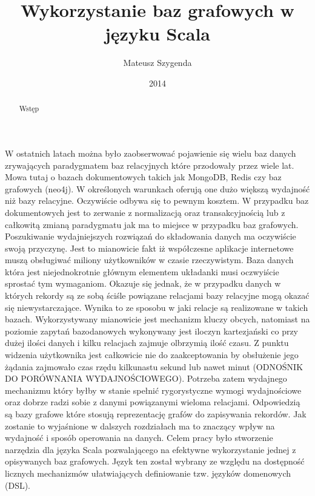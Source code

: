 \documentclass[brudnopis]{xmgr}
\author   {Mateusz Szygenda}
\title    {Wykorzystanie baz grafowych w języku Scala}
\date     {2014}
\begin{document}
\begin{abstract}
Wstęp
\end{abstract}

\maketitle

%
\introduction

W ostatnich latach można było zaobserwować pojawienie się wielu baz danych zrywających paradygmatem baz relacyjnych które przodowały przez wiele lat. Mowa tutaj o bazach dokumentowych takich jak MongoDB, Redis czy baz grafowych (neo4j). W określonych warunkach oferują one dużo większą wydajność niż bazy relacyjne. Oczywiście odbywa się to pewnym kosztem. W przypadku baz dokumentowych jest to zerwanie z normalizacją oraz transakcyjnością lub z całkowitą zmianą paradygmatu jak ma to miejsce w przypadku baz grafowych. Poszukiwanie wydajniejszych rozwiązań do składowania danych ma oczywiście swoją przyczynę. Jest to mianowicie fakt iż współczesne aplikacje internetowe muszą obsługiwać miliony użytkowników w czasie rzeczywistym. Baza danych która jest niejednokrotnie głównym elementem układanki musi oczwyiście sprostać tym wymaganiom. Okazuje się jednak, że w przypadku danych w których rekordy są ze sobą ściśle powiązane relacjami bazy relacyjne mogą okazać się niewystarczające. Wynika to ze sposobu w jaki relacje są realizowane w takich bazach. Wykorzystywany mianowicie jest mechanizm kluczy obcych, natomiast na poziomie zapytań bazodanowych wykonywany jest iloczyn kartezjański co przy dużej ilości danych i kilku relacjach zajmuje olbrzymią ilość czasu. Z punktu widzenia użytkownika jest całkowicie nie do zaakceptowania by obsłużenie jego żądania zajmowało czas rzędu kilkunastu sekund lub nawet minut (ODNOŚNIK DO PORÓWNANIA WYDAJNOŚCIOWEGO). Potrzeba zatem wydajnego mechanizmu który byłby w stanie spełnić rygorystyczne wymogi wydajnościowe oraz dobrze radzi sobie z danymi powiązanymi wieloma relacjami. Odpowiedzią są bazy grafowe które stosują reprezentację grafów do zapisywania rekordów. Jak zostanie to wyjaśnione  w dalszych rozdziałach ma to znaczący wpływ na wydajność i sposób operowania na danych. Celem pracy było stworzenie narzędzia dla języka Scala pozwalającego na efektywne wykorzystanie jednej z opisywanych baz grafowych. Język ten został wybrany ze względu na dostępność licznych mechanizmów ułatwiających definiowanie tzw. języków domenowych (DSL). 
\end{document}
